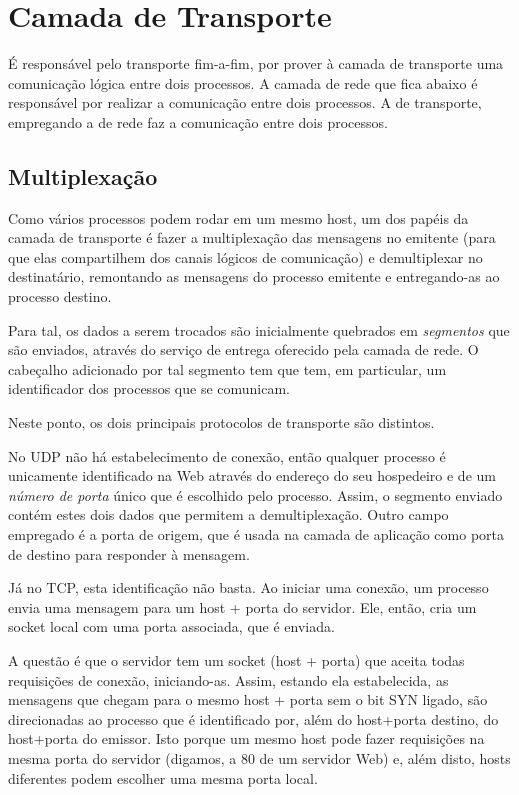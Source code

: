\chapter{Camada de Transporte}

É responsável pelo transporte fim-a-fim, por prover à camada de transporte uma comunicação lógica entre dois processos.
A camada de rede que fica abaixo é responsável por realizar a comunicação entre dois processos.
A de transporte, empregando a de rede faz a comunicação entre dois processos.

\section{Multiplexação}

Como vários processos podem rodar em um mesmo host, um dos papéis da camada de transporte é fazer a multiplexação das mensagens no emitente (para que elas compartilhem dos canais lógicos de comunicação) e demultiplexar no destinatário, remontando as mensagens do processo emitente e entregando-as ao processo destino.

Para tal, os dados a serem trocados são inicialmente quebrados em \emph{segmentos} que são enviados, através do serviço de entrega oferecido pela camada de rede.
O cabeçalho adicionado por tal segmento tem que tem, em particular, um identificador dos processos que se comunicam.

Neste ponto, os dois principais protocolos de transporte são distintos.

No UDP não há estabelecimento de conexão, então qualquer processo é unicamente identificado na Web através do endereço do seu hospedeiro e de um \emph{número de porta} único que é escolhido pelo processo.
Assim, o segmento enviado contém estes dois dados que permitem a demultiplexação.
Outro campo empregado é a porta de origem, que é usada na camada de aplicação como porta de destino para responder à mensagem.

Já no TCP, esta identificação não basta.
Ao iniciar uma conexão, um processo envia uma mensagem para um host + porta do servidor.
Ele, então, cria um socket local com uma porta associada, que é enviada.

A questão é que o servidor tem um socket (host + porta) que aceita todas requisições de conexão, iniciando-as.
Assim, estando ela estabelecida, as mensagens que chegam para o mesmo host + porta sem o bit SYN ligado, são direcionadas ao processo que é identificado por, além do host+porta destino, do host+porta do emissor.
Isto porque um mesmo host pode fazer requisições na mesma porta do servidor (digamos, a 80 de um servidor Web) e, além disto, hosts diferentes podem escolher uma mesma porta local.

